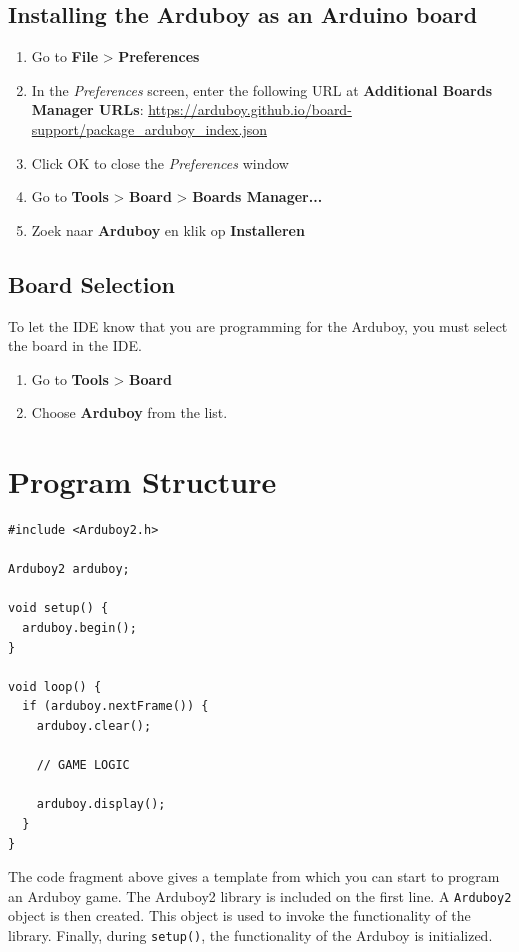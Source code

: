 \documentclass[11pt,fleqn]{book} %
\begin{document}
\subsection{Installing the Arduboy as an Arduino board}
\begin{enumerate}
	\item Go to \textbf{File} > \textbf{Preferences}
	\item In the \emph{Preferences} screen, enter the following URL at \textbf{Additional Boards Manager URLs}: \url{https://arduboy.github.io/board-support/package_arduboy_index.json}
	\item Click OK to close the \emph{Preferences} window
	\item Go to \textbf{Tools} > \textbf{Board} > \textbf{Boards Manager...}
	\item Zoek naar \textbf{Arduboy} en klik op \textbf{Installeren}
\end{enumerate}

\subsection{Board Selection}
To let the IDE know that you are programming for the Arduboy, you must select the board in the IDE.

\begin{enumerate}
	\item Go to \textbf{Tools} > \textbf{Board}
	\item Choose \textbf{Arduboy} from the list.
\end{enumerate}


\section{Program Structure}

\begin{verbatim}
#include <Arduboy2.h>

Arduboy2 arduboy;

void setup() {
  arduboy.begin();
}

void loop() {
  if (arduboy.nextFrame()) {
    arduboy.clear();

    // GAME LOGIC

    arduboy.display();
  }
}
\end{verbatim}
\noindent
The code fragment above gives a template from which you can start to program an Arduboy game. The Arduboy2 library is included on the first line. A \texttt{Arduboy2} object is then created. This object is used to invoke the functionality of the library. Finally, during \texttt{setup()}, the functionality of the Arduboy is initialized.
\end{document}
